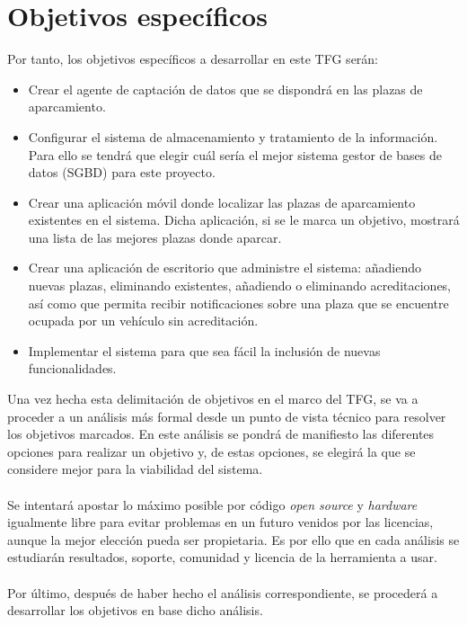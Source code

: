\section{Objetivos específicos}
Por tanto, los objetivos específicos a desarrollar en este TFG serán:
\begin{itemize}
	\item Crear el agente de captación de datos que se dispondrá en las plazas de aparcamiento.
	\item Configurar el sistema de almacenamiento y tratamiento de la información. Para ello se tendrá que elegir cuál sería el mejor sistema gestor de bases de datos (SGBD) para este proyecto.
	\item Crear una aplicación móvil donde localizar las plazas de aparcamiento existentes en el sistema. Dicha aplicación, si se le marca un objetivo, mostrará una lista de las mejores plazas donde aparcar.
	\item Crear una aplicación de escritorio que administre el sistema: añadiendo nuevas plazas, eliminando existentes, añadiendo o eliminando acreditaciones, así como que permita recibir notificaciones sobre una plaza que se encuentre ocupada por un vehículo sin acreditación.
	\item Implementar el sistema para que sea fácil la inclusión de nuevas funcionalidades.
\end{itemize}
Una vez hecha esta delimitación de objetivos en el marco del TFG, se va a proceder a un análisis más formal desde un punto de vista técnico para resolver los objetivos marcados. En este análisis se pondrá de manifiesto las diferentes opciones para realizar un objetivo y, de estas opciones, se elegirá la que se considere mejor para la viabilidad del sistema.
\\\\
Se intentará apostar lo máximo posible por código \textit{open source} y \textit{hardware} igualmente libre para evitar problemas en un futuro venidos por las licencias, aunque la mejor elección pueda ser propietaria. Es por ello que en cada análisis se estudiarán resultados, soporte, comunidad y licencia de la herramienta a usar.
\\\\
Por último, después de haber hecho el análisis correspondiente, se procederá a desarrollar los objetivos en base dicho análisis.
